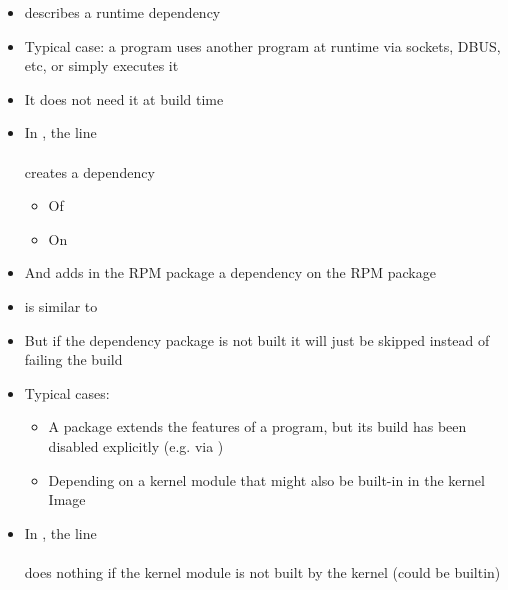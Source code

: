 \begin{frame}{}
  \begin{itemize}
    \item {} describes a runtime dependency
    \item Typical case: a program uses another program at runtime via
      sockets, DBUS, etc, or simply executes it
    \item It does not need it at build time
    \item In , the line\\
      \\
      creates a dependency
      \begin{itemize}
      \item Of 
      \item On 
      \end{itemize}
    \item And adds in the  RPM package a dependency on
      the  RPM package
  \end{itemize}
\end{frame}

\begin{frame}{}
  \begin{itemize}
    \item {} is similar to 
    \item But if the dependency package is not built it will just be
      skipped instead of failing the build
    \item Typical cases:
      \begin{itemize}
        \item A package extends the features of a program, but its build
          has been disabled explicitly (e.g. via )
        \item Depending on a kernel module that might also be built-in in
          the kernel Image
      \end{itemize}
    \item In , the line\\
      \\
      does nothing if the  kernel module is not built by
      the kernel (could be builtin)
  \end{itemize}
\end{frame}
